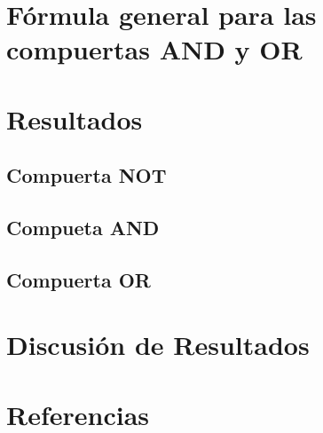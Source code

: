 \documentclass{article}
\begin{document}
\section{Fórmula general para las compuertas AND y OR}
\section{Resultados}
\subsection{Compuerta NOT}
\subsection{Compueta AND}
\subsection{Compuerta OR}
\section{Discusión de Resultados}
\section{Referencias}
\end{document}
